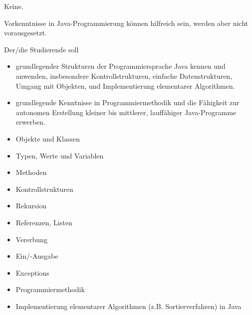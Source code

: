 \begin{module}
\begin{styleenv}
\begin{conditions}Keine.\end{conditions}

\begin{recommendations}Vorkenntnisse in Java-Programmierung können hilfreich sein, werden aber nicht vorausgesetzt.

\end{recommendations}
\end{styleenv}

\begin{learningoutcomes}
Der/die Studierende soll

 \begin{itemize}\item grundlegender Strukturen der Programmiersprache Java kennen und anwenden, insbesondere Kontrollstrukturen, einfache Datenstrukturen, Umgang mit Objekten, und Implementierung elementarer Algorithmen.  \item grundlegende Kenntnisse in Programmiermethodik und die Fähigkeit zur autonomen Erstellung kleiner bis mittlerer, lauffähiger Java-Programme erwerben.  \end{itemize}
\end{learningoutcomes}

\begin{content}
\begin{itemize}\item Objekte und Klassen  \item Typen, Werte und Variablen  \item Methoden  \item Kontrollstrukturen  \item Rekursion  \item Referenzen, Listen  \item Vererbung   \item Ein/-Ausgabe  \item Exceptions  \item Programmiermethodik  \item Implementierung elementarer Algorithmen (z.B. Sortierverfahren) in Java  \end{itemize}
\end{content}



\end{module}

